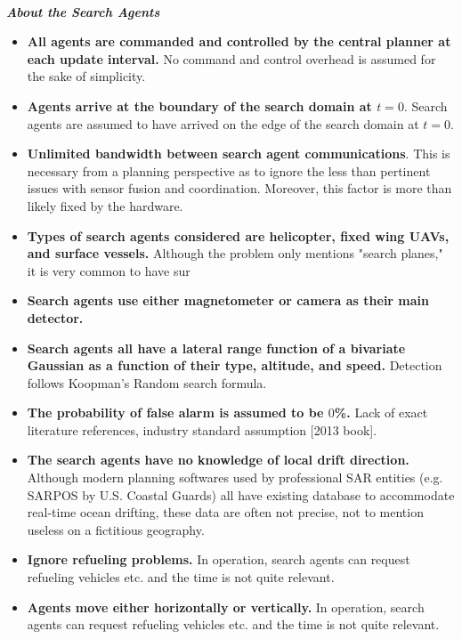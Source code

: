 \documentclass[12pt, letterpaper]{article}  %
\theoremstyle{definition}
\theoremstyle{remark}
\theoremstyle{plain}
\begin{document}
\ \\
\textit{\textbf{About the Search Agents}}
\begin{itemize}
\item \textbf{All agents are commanded and controlled by the central planner at each update interval.} No command and control overhead is assumed for the sake of simplicity.
\item \textbf{Agents arrive at the boundary of the search domain at $t=0$}.  Search agents are assumed to have arrived on the edge of the search domain at $t=0$.
\item \textbf{Unlimited bandwidth between search agent communications}.  This is necessary from a planning perspective as to ignore the less than pertinent issues with sensor fusion and coordination. Moreover, this factor is more than likely fixed by the hardware.
\item \textbf{Types of search agents considered are helicopter, fixed wing UAVs, and surface vessels.} Although the problem only mentions "search planes," it is very common to have sur
\item \textbf{Search agents use either magnetometer or camera as their main detector.}
\item \textbf{Search agents all have a lateral range function of a bivariate Gaussian as a function of their type, altitude, and speed.} Detection follows Koopman's Random search formula.
\item \textbf{The probability of false alarm is assumed to be $0$\%.} Lack of exact literature references, industry standard assumption [2013 book]. 
\item \textbf{The search agents have no knowledge of local drift direction.} Although modern planning softwares used by professional SAR entities (e.g. SARPOS by U.S. Coastal Guards) all have existing database to accommodate real-time ocean drifting, these data are often not precise, not to mention useless on a fictitious geography.
\item \textbf{Ignore refueling problems.} In operation, search agents can request refueling vehicles etc. and the time is not quite relevant.
\item \textbf{Agents move either horizontally or vertically.} In operation, search agents can request refueling vehicles etc. and the time is not quite relevant.

\end{itemize}


\end{document}
